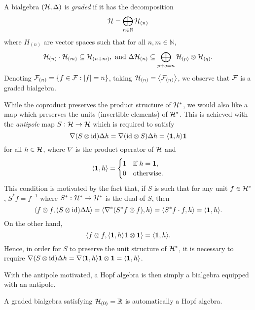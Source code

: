 \documentclass[11pt]{style/preprint}
\begin{document}
A bialgebra \(({\mathcal H}, \Delta)\) is \textit{graded} if it has the decomposition 
\[{\mathcal H} = \bigoplus_{n \in \mathbb{N}} {\mathcal H}_{(n)}\]
where \(H_{(n)}\) are vector spaces such that for all \(n, m \in \mathbb{N}\),
\[{\mathcal H}_{(n)} \cdot {\mathcal H}_{(m)} \subseteq {\mathcal H}_{(n + m)}, \text{ and } 
  \Delta {\mathcal H}_{(n)} \subseteq \bigoplus_{p + q = n} {\mathcal H}_{(p)} \otimes {\mathcal H}_{(q)}.\]
Denoting \({\mathcal F}_{(n)} = \{f \in {\mathcal F} : |f| = n\}\), taking \(\CH_{(n)} = \< \CF_{(n)}\>\), 
we observe that \({\mathcal F}\) is a graded bialgebra. 

While the coproduct preserves the product structure of \({\mathcal H}^*\), we would also like a map which 
preserves the units (invertible elements) of \({\mathcal H}^*\). This is achieved with the \textit{antipole} 
map \(S : {\mathcal H} \to {\mathcal H}\) which is required to satisfy
\begin{equation}\label{eq:antipole}
  \nabla (S \otimes \text{id}) \Delta h = \nabla (\text{id} \otimes S) \Delta h = \< \mathbf{1}, h\> \mathbf{1}
\end{equation}
for all \(h \in {\mathcal H}\), where \(\nabla\) is the product operator of \({\mathcal H}\) and 
\[\<\mathbf{1}, h\> = 
\begin{cases}
  1 & \text{if } h = \mathbf{1},\\
  0 & \text{otherwise}.
\end{cases}\]
This condition is motivated by the fact that, if \(S\) is such that for any unit \(f \in {\mathcal H}^*\), 
\(S^* f = f^{-1}\) where \(S^* : {\mathcal H}^* \to {\mathcal H}^*\) is the dual of \(S\), then
\[\< f \otimes f, (S \otimes \text{id})\Delta h\> 
  = \< \nabla^* (S^* f \otimes f), h\> = \< S^* f \cdot f, h\> = \< \mathbf{1}, h\>.\]
On the other hand, 
\[\< f \otimes f, \< \mathbf{1}, h\> \mathbf{1} \otimes \mathbf{1}\> = \< \mathbf{1}, h\>.\]
Hence, in order for \(S\) to preserve the unit structure of \({\mathcal H}^*\), it is necessary to require
\(\nabla (S \otimes \text{id})\Delta h = \nabla \< \mathbf{1}, h\> \mathbf{1} \otimes \mathbf{1} 
= \< \mathbf{1}, h\>\). 

With the antipole motivated, a Hopf algebra is then simply a bialgebra equipped with an antipole.

\begin{proposition}
  A graded bialgebra satisfying \({\mathcal H}_{(0)} = \mathbb{R}\) is automatically a Hopf algebra.
\end{proposition}
\end{document}
